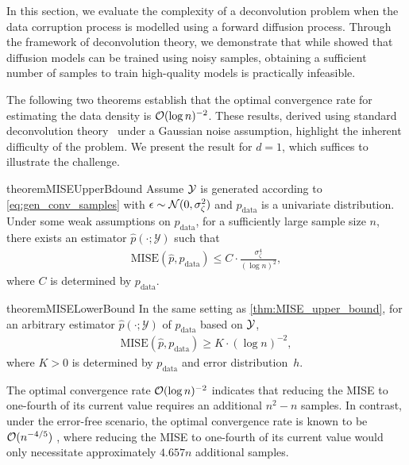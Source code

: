In this section, we evaluate the complexity of a deconvolution problem when the data corruption process is modelled using a forward diffusion process. Through the framework of deconvolution theory, we demonstrate that while \citet{DarasDD2024} showed that diffusion models can be trained using noisy samples, obtaining a sufficient number of samples to train high-quality models is practically infeasible.

The following two theorems establish that the optimal convergence rate for estimating the data density is $\mathcal{O}(\log n)^{-2}$. These results, derived using standard deconvolution theory~\citep{Meister2009} under a Gaussian noise assumption, highlight the inherent difficulty of the problem. We present the result for $d = 1$, which suffices to illustrate the challenge.  
\begin{restatable}{theorem}{MISEUpperBdound}
\label{thm:MISE_upper_bound}
Assume $ \mathcal{Y} $ is generated according to \eqref{eq:gen_conv_samples} with $ \epsilon \sim \mathcal{N}(0, \sigma_\zeta^2) $ and $ p_\text{data} $  is a univariate distribution.  Under some weak assumptions on $ p_\text{data}$, for a sufficiently large sample size $ n $, there exists an estimator $ \hat{p}(\cdot; \mathcal{Y}) $ such that
    \begin{align}
        \mathrm{MISE}(\hat{p}, p_\textrm{data}) \leq C \cdot \frac{ \sigma_\zeta^4}{(\log n)^2},\label{eq:MISE_upper_bound}
    \end{align}
    where $ C $ is determined by $ p_\textrm{data} $.
\end{restatable}
\begin{restatable}{theorem}{MISELowerBound}
\label{thm:MISE_lower_bound}
In the same setting as \cref{thm:MISE_upper_bound}, for an arbitrary estimator $ \hat{p}(\cdot; \mathcal{Y}) $ of $p_\textrm{data}$ based on $\mathcal{Y}$, 
\begin{align}
	\mathrm{MISE}(\hat{p}, p_\textrm{data}) \geq K \cdot (\log n)^{-2},
\end{align}
where $K>0$ is determined by $p_\textrm{data}$ and error distribution~$h$. 
\end{restatable}
The optimal convergence rate $\mathcal{O}(\log n)^{-2}$ indicates that reducing the MISE to one-fourth of its current value requires an additional $ n^2 - n $ samples. In contrast, under the error-free scenario, the optimal convergence rate is known to be $ \mathcal{O}(n^{-4/5})$ \citep{Wand1998}, where reducing the MISE to one-fourth of its current value would only necessitate approximately $ 4.657n $ additional samples.

